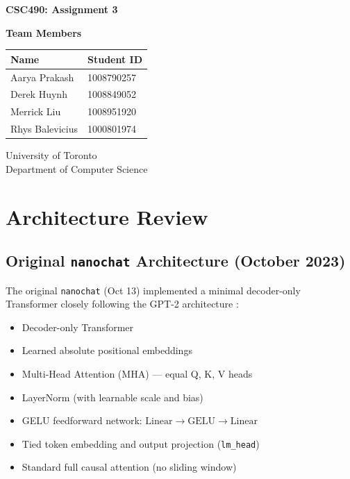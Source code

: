 \documentclass[a4paper,12pt]{article}
\begin{document}
\begin{titlepage}
    \centering
    \vspace*{1cm}
    
    \Huge
    \textbf{CSC490: Assignment 3}
    
    \vspace{0.5cm}
    
    \vspace{1.5cm}
    
    \textbf{Team Members}
    
    \vspace{0.8cm}
    
    \large
    \begin{tabular}{ll}
        \textbf{Name} & \textbf{Student ID} \\
        \midrule
        Aarya Prakash & 1008790257 \\
        Derek Huynh & 1008849052 \\
        Merrick Liu & 1008951920 \\
        Rhys Balevicius & 1000801974 \\
    \end{tabular}
    
    \vfill
    
    \large
    University of Toronto\\
    Department of Computer Science    
\end{titlepage}

\section{Architecture Review}

\subsection{Original \texttt{nanochat} Architecture (October 2023)}

The original \texttt{nanochat} (Oct 13) implemented a minimal decoder-only Transformer closely following the GPT-2 architecture \cite{radford2019language}:

\begin{itemize}
    \item Decoder-only Transformer
    \item Learned absolute positional embeddings
    \item Multi-Head Attention (MHA) — equal Q, K, V heads
    \item LayerNorm (with learnable scale and bias)
    \item GELU feedforward network: $\text{Linear} \rightarrow \text{GELU} \rightarrow \text{Linear}$
    \item Tied token embedding and output projection (\texttt{lm\_head})
    \item Standard full causal attention (no sliding window)
\end{itemize}
\end{document}
